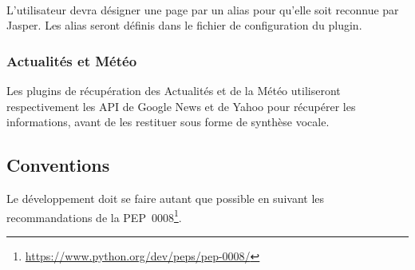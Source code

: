 \documentclass[12pt]{article}
\begin{document}
		\paragraph{}
		L'utilisateur devra désigner une page par un alias pour qu'elle soit reconnue par Jasper. Les alias seront définis dans le fichier de configuration du plugin.
		
		\subsubsection{Actualités et Météo}
		Les plugins de récupération des Actualités et de la Météo utiliseront respectivement les API de Google News et de Yahoo pour récupérer les informations, avant de les restituer sous forme de synthèse vocale.

		\subsection{Conventions}
		Le développement doit se faire autant que possible en suivant les recommandations de la PEP~0008\footnote{\url{https://www.python.org/dev/peps/pep-0008/}}.
\end{document}
